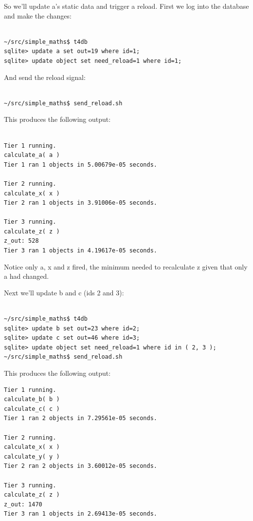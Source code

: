 \documentclass{report}
\begin{document}
So we'll update a's static data and trigger a reload. First we log into the database and make the changes:

\begin{verbatim}

~/src/simple_maths$ t4db
sqlite> update a set out=19 where id=1;
sqlite> update object set need_reload=1 where id=1;

\end{verbatim}

And send the reload signal:

\begin{verbatim}

~/src/simple_maths$ send_reload.sh

\end{verbatim}

This produces the following output:

\begin{verbatim}

Tier 1 running.
calculate_a( a )
Tier 1 ran 1 objects in 5.00679e-05 seconds.

Tier 2 running.
calculate_x( x )
Tier 2 ran 1 objects in 3.91006e-05 seconds.

Tier 3 running.
calculate_z( z )
z_out: 528
Tier 3 ran 1 objects in 4.19617e-05 seconds.

\end{verbatim}

Notice only a, x and z fired, the minimum needed to recalculate z given that only a had changed. 

Next we'll update b and c (ids 2 and 3):

\begin{verbatim}

~/src/simple_maths$ t4db
sqlite> update b set out=23 where id=2;
sqlite> update c set out=46 where id=3;
sqlite> update object set need_reload=1 where id in ( 2, 3 );
~/src/simple_maths$ send_reload.sh
\end{verbatim}

This produces the following output:

\begin{verbatim}
Tier 1 running.
calculate_b( b )
calculate_c( c )
Tier 1 ran 2 objects in 7.29561e-05 seconds.

Tier 2 running.
calculate_x( x )
calculate_y( y )
Tier 2 ran 2 objects in 3.60012e-05 seconds.

Tier 3 running.
calculate_z( z )
z_out: 1470
Tier 3 ran 1 objects in 2.69413e-05 seconds.
\end{verbatim}
\end{document}
